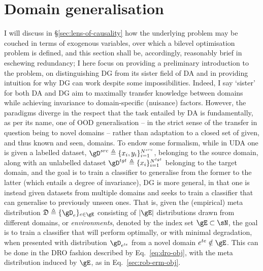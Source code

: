 \section{Domain generalisation}\label{sec:dg}
 I will discuss in \S\ref{sec:lens-of-causality} how the underlying problem may be couched in terms
 of exogenous variables, over which a bilevel optimisation problem is defined, and this section
 shall be, accordingly, reasonably brief in eschewing redundancy; I here focus on providing a
 preliminary introduction to the problem, on distinguishing \ac{DG} from its sister field of
 \ac{DA} and in providing intuition for why \ac{DG} can work despite some impossibilities.
%
Indeed, I say `sister' for both \acl{DA} and \acl{DG} aim to maximally transfer knowledge between
domains while achieving invariance to domain-specific (nuisance) factors. 
%
However, the paradigms diverge in the respect that the task entailed by \ac{DA} is fundamentally,
as per its name, one of \ac{OOD} generalisation -- in the strict sense of the transfer in question
being to novel domains -- rather than adaptation to a closed set of given, and thus known and seen,
domains.
%
%
To endow some formalism, while in \ac{UDA} one is given a labelled dataset, \( \gD^{src} \triangleq
\{x_i, y_i \}_{i=1}^{N^{src}} \), belonging to the source domain, along with an unlabelled dataset
\( \gD^{tgt} \triangleq \{ x_i \}_{i=1}^{N^{tgt}} \) belonging to the target domain, and the goal
is to train a classifier to generalise from the former to the latter (which entails a degree of
invariance), \ac{DG} is more general, in that one is instead given datasets from multiple domains
and seeks to train a classifier that can generalise to previously unseen ones. 
%
That is, given the (empirical) meta distribution \( \mathfrak{D} \triangleq \{\gD_e \}_{e \in \gE}
\) consisting of \( |\gE| \) distributions drawn from different domains, or \emph{environments},
denoted by the index set \( \gE \subset \sN \), the goal is to train a classifier that will perform
optimally, or with minimal degradation, when presented with distribution \( \gD_{e^{te}} \) from a
novel domain \( e^{te} \notin  \gE \).
%
This can be done in the \ac{DRO} fashion described by Eq.~\ref{eq:dro-obj}, with the meta
distribution induced by \(\gE\), as in Eq.~\ref{sec:rob-erm-obj}.

